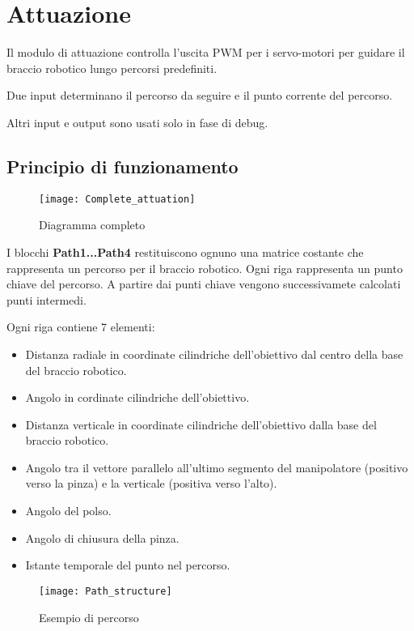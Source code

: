 \documentclass[12pt]{report}
\begin{document}
\chapter{Attuazione}

Il modulo di attuazione controlla l'uscita PWM per i servo-motori per guidare il braccio robotico lungo percorsi predefiniti.

Due input determinano il percorso da seguire e il punto corrente del percorso.

Altri input e output sono usati solo in fase di debug.

\section{Principio di funzionamento}

\begin{figure}
\texttt{[image: Complete\_attuation]}
\caption{Diagramma completo}
\end{figure}

I blocchi \textbf{Path1...Path4} restituiscono ognuno una matrice costante che rappresenta un percorso per il braccio robotico. Ogni riga rappresenta un punto chiave del percorso. A partire dai punti chiave vengono successivamete calcolati punti intermedi.

Ogni riga contiene 7 elementi:

\begin{itemize}
\item Distanza radiale in coordinate cilindriche dell'obiettivo dal centro della base del braccio robotico.
\item Angolo in cordinate cilindriche dell'obiettivo.
\item Distanza verticale in coordinate cilindriche dell'obiettivo dalla base del braccio robotico.
\item Angolo tra il vettore parallelo all'ultimo segmento del manipolatore (positivo verso la pinza) e la verticale (positiva verso l'alto).
\item Angolo del polso.
\item Angolo di chiusura della pinza.
\item Istante temporale del punto nel percorso.
\end{itemize}

\begin{figure}
\texttt{[image: Path\_structure]}
\caption{Esempio di percorso}
\end{figure}
\end{document}

